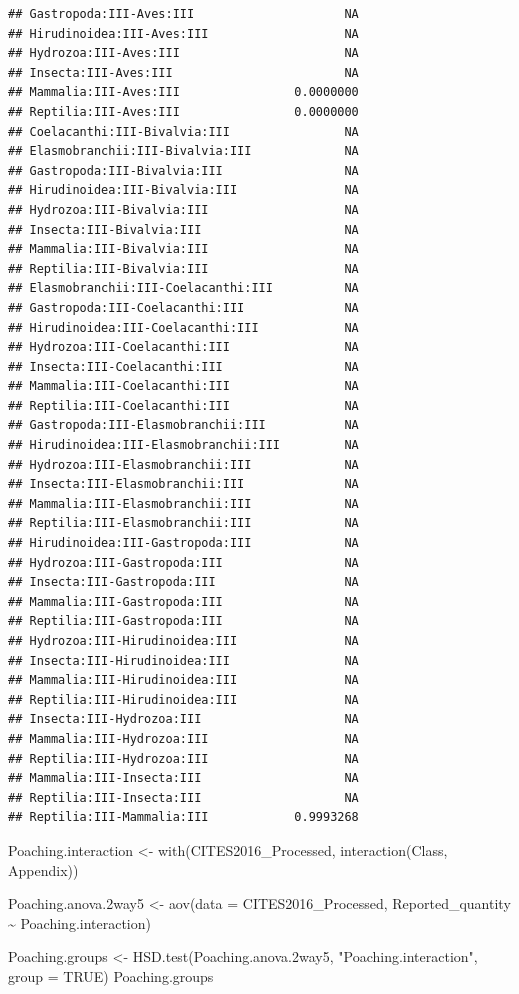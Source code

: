 \documentclass[
  12pt,
]{article}
\newenvironment{Shaded}{\begin{snugshade}}{\end{snugshade}}
\newcommand{\AttributeTok}[1]{\textcolor[rgb]{0.77,0.63,0.00}{#1}}
\newcommand{\ConstantTok}[1]{\textcolor[rgb]{0.00,0.00,0.00}{#1}}
\newcommand{\FloatTok}[1]{\textcolor[rgb]{0.00,0.00,0.81}{#1}}
\newcommand{\FunctionTok}[1]{\textcolor[rgb]{0.00,0.00,0.00}{#1}}
\newcommand{\NormalTok}[1]{#1}
\newcommand{\OtherTok}[1]{\textcolor[rgb]{0.56,0.35,0.01}{#1}}
\newcommand{\SpecialCharTok}[1]{\textcolor[rgb]{0.00,0.00,0.00}{#1}}
\newcommand{\StringTok}[1]{\textcolor[rgb]{0.31,0.60,0.02}{#1}}
\begin{document}
\begin{verbatim}
## Gastropoda:III-Aves:III                     NA
## Hirudinoidea:III-Aves:III                   NA
## Hydrozoa:III-Aves:III                       NA
## Insecta:III-Aves:III                        NA
## Mammalia:III-Aves:III                0.0000000
## Reptilia:III-Aves:III                0.0000000
## Coelacanthi:III-Bivalvia:III                NA
## Elasmobranchii:III-Bivalvia:III             NA
## Gastropoda:III-Bivalvia:III                 NA
## Hirudinoidea:III-Bivalvia:III               NA
## Hydrozoa:III-Bivalvia:III                   NA
## Insecta:III-Bivalvia:III                    NA
## Mammalia:III-Bivalvia:III                   NA
## Reptilia:III-Bivalvia:III                   NA
## Elasmobranchii:III-Coelacanthi:III          NA
## Gastropoda:III-Coelacanthi:III              NA
## Hirudinoidea:III-Coelacanthi:III            NA
## Hydrozoa:III-Coelacanthi:III                NA
## Insecta:III-Coelacanthi:III                 NA
## Mammalia:III-Coelacanthi:III                NA
## Reptilia:III-Coelacanthi:III                NA
## Gastropoda:III-Elasmobranchii:III           NA
## Hirudinoidea:III-Elasmobranchii:III         NA
## Hydrozoa:III-Elasmobranchii:III             NA
## Insecta:III-Elasmobranchii:III              NA
## Mammalia:III-Elasmobranchii:III             NA
## Reptilia:III-Elasmobranchii:III             NA
## Hirudinoidea:III-Gastropoda:III             NA
## Hydrozoa:III-Gastropoda:III                 NA
## Insecta:III-Gastropoda:III                  NA
## Mammalia:III-Gastropoda:III                 NA
## Reptilia:III-Gastropoda:III                 NA
## Hydrozoa:III-Hirudinoidea:III               NA
## Insecta:III-Hirudinoidea:III                NA
## Mammalia:III-Hirudinoidea:III               NA
## Reptilia:III-Hirudinoidea:III               NA
## Insecta:III-Hydrozoa:III                    NA
## Mammalia:III-Hydrozoa:III                   NA
## Reptilia:III-Hydrozoa:III                   NA
## Mammalia:III-Insecta:III                    NA
## Reptilia:III-Insecta:III                    NA
## Reptilia:III-Mammalia:III            0.9993268
\end{verbatim}

\begin{Shaded}
\begin{Highlighting}[]
\NormalTok{Poaching.interaction }\OtherTok{\textless{}{-}} \FunctionTok{with}\NormalTok{(CITES2016\_Processed, }\FunctionTok{interaction}\NormalTok{(Class, Appendix))}

\NormalTok{Poaching.anova}\FloatTok{.2}\NormalTok{way5 }\OtherTok{\textless{}{-}} \FunctionTok{aov}\NormalTok{(}\AttributeTok{data =}\NormalTok{ CITES2016\_Processed, Reported\_quantity }\SpecialCharTok{\textasciitilde{}}\NormalTok{ Poaching.interaction)}

\NormalTok{Poaching.groups }\OtherTok{\textless{}{-}} \FunctionTok{HSD.test}\NormalTok{(Poaching.anova}\FloatTok{.2}\NormalTok{way5, }\StringTok{"Poaching.interaction"}\NormalTok{, }\AttributeTok{group =} \ConstantTok{TRUE}\NormalTok{)}
\NormalTok{Poaching.groups}
\end{Highlighting}
\end{Shaded}
\end{document}
